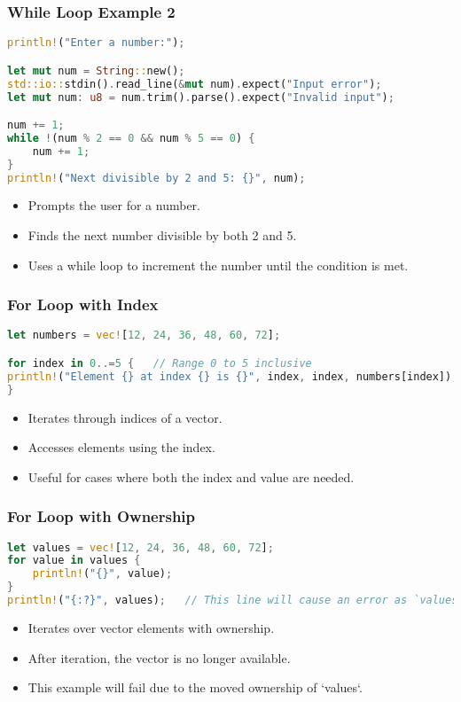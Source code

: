 \documentclass[aspectratio=169, table]{beamer}
\begin{document}
\begin{frame}[fragile]
\frametitle{While Loop Example 2}
\vspace{10pt}
\begin{lstlisting}[language=Rust]
println!("Enter a number:");

let mut num = String::new();
std::io::stdin().read_line(&mut num).expect("Input error");
let mut num: u8 = num.trim().parse().expect("Invalid input");

num += 1;
while !(num % 2 == 0 && num % 5 == 0) {
	num += 1;
}
println!("Next divisible by 2 and 5: {}", num);
\end{lstlisting}
\begin{itemize}
\item Prompts the user for a number.
\item Finds the next number divisible by both 2 and 5.
\item Uses a while loop to increment the number until the condition is met.
\end{itemize}
\end{frame}

\begin{frame}[fragile]
\frametitle{For Loop with Index}
\begin{lstlisting}[language=Rust]
let numbers = vec![12, 24, 36, 48, 60, 72];

for index in 0..=5 {   // Range 0 to 5 inclusive
println!("Element {} at index {} is {}", index, index, numbers[index]);
}
\end{lstlisting}
\begin{itemize}
\item Iterates through indices of a vector.
\item Accesses elements using the index.
\item Useful for cases where both the index and value are needed.
\end{itemize}
\end{frame}

\begin{frame}[fragile]
\frametitle{For Loop with Ownership}
\begin{lstlisting}[language=Rust]
let values = vec![12, 24, 36, 48, 60, 72];
for value in values {
	println!("{}", value);
}
println!("{:?}", values);   // This line will cause an error as `values` is moved
\end{lstlisting}
\begin{itemize}
\item Iterates over vector elements with ownership.
\item After iteration, the vector is no longer available.
\item This example will fail due to the moved ownership of `values`.
\end{itemize}
\end{frame}
\end{document}
